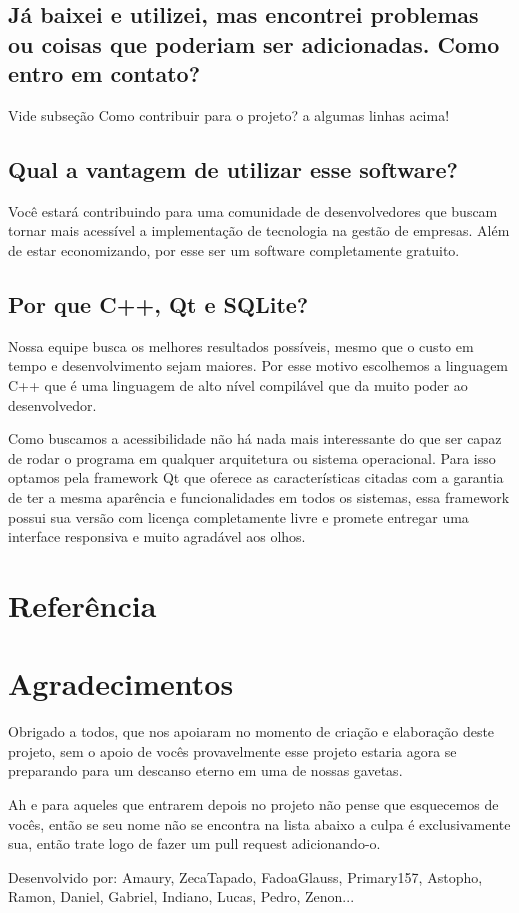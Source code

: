 \documentclass[a4paper,12pt]{article}
\begin{document}
		\subsection{Já baixei e utilizei, mas encontrei problemas ou coisas que poderiam ser adicionadas. Como entro em contato?}
			Vide subseção Como contribuir para o projeto? a algumas linhas acima!
		\subsection{Qual a vantagem de utilizar esse software?}
			Você estará contribuindo para uma comunidade de desenvolvedores que buscam tornar mais acessível a implementação de tecnologia na gestão de empresas. Além de estar economizando, por esse ser um software completamente gratuito.
		\subsection{Por que C++, Qt e SQLite?}
			Nossa equipe busca os melhores resultados possíveis, mesmo que o custo em tempo e desenvolvimento sejam maiores. Por esse motivo escolhemos a linguagem C++ que é uma linguagem de alto nível compilável que da muito poder ao desenvolvedor. 
			
			Como buscamos a acessibilidade não há nada mais interessante do que ser capaz de rodar o programa em qualquer arquitetura ou sistema operacional. Para isso optamos pela framework Qt que oferece as características citadas com a garantia de ter a mesma aparência e funcionalidades em todos os sistemas, essa framework possui sua versão com licença completamente livre e promete entregar uma interface responsiva e muito agradável aos olhos. 
	\section{Referência}
	\section{Agradecimentos}
		Obrigado a todos, que nos apoiaram no momento de criação e elaboração deste projeto, sem o apoio de vocês provavelmente esse projeto estaria agora se preparando para um descanso eterno em uma de nossas gavetas.
		
		Ah e para aqueles que entrarem depois no projeto não pense que esquecemos de vocês, então se seu nome não se encontra na lista abaixo a culpa é exclusivamente sua, então trate logo de fazer um pull request adicionando-o.
		
		Desenvolvido por: Amaury, ZecaTapado, FadoaGlauss, Primary157, Astopho, Ramon, Daniel, Gabriel, Indiano, Lucas, Pedro, Zenon...
\end{document}
